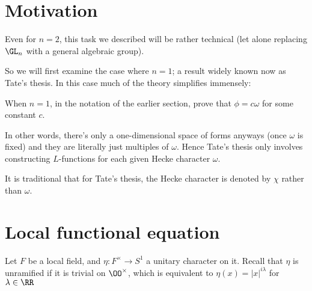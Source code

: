 
\section{Motivation}
Even for $n=2$, this task we described will be rather technical
(let alone replacing $\GL_n$ with a general algebraic group).

So we will first examine the case where $n=1$;
a result widely known now as Tate's thesis.
In this case much of the theory simplifies immensely:
\begin{exercise}
  When $n=1$, in the notation of the earlier section,
  prove that $\phi = c \omega$ for some constant $c$.
\end{exercise}
In other words, there's only a one-dimensional space
of forms anyways (once $\omega$ is fixed)
and they are literally just multiples of $\omega$.
Hence Tate's thesis only involves constructing $L$-functions
for each given Hecke character $\omega$.

It is traditional that for Tate's thesis,
the Hecke character is denoted by $\chi$ rather than $\omega$.

\section{Local functional equation}
Let $F$ be a local field, and $\eta \colon F^\times \to S^1$
a unitary character on it.
Recall that $\eta$ is unramified if it is trivial on $\OO^\times$,
which is equivalent to $\eta(x) = |x|^{i\lambda}$ for $\lambda \in \RR$

